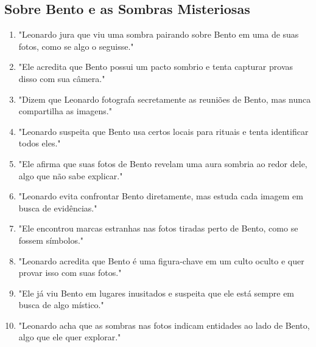\subsection*{Sobre Bento e as Sombras Misteriosas}
\begin{enumerate}
    \item "Leonardo jura que viu uma sombra pairando sobre Bento em uma de suas fotos, como se algo o seguisse."
    \item "Ele acredita que Bento possui um pacto sombrio e tenta capturar provas disso com sua câmera."
    \item "Dizem que Leonardo fotografa secretamente as reuniões de Bento, mas nunca compartilha as imagens."
    \item "Leonardo suspeita que Bento usa certos locais para rituais e tenta identificar todos eles."
    \item "Ele afirma que suas fotos de Bento revelam uma aura sombria ao redor dele, algo que não sabe explicar."
    \item "Leonardo evita confrontar Bento diretamente, mas estuda cada imagem em busca de evidências."
    \item "Ele encontrou marcas estranhas nas fotos tiradas perto de Bento, como se fossem símbolos."
    \item "Leonardo acredita que Bento é uma figura-chave em um culto oculto e quer provar isso com suas fotos."
    \item "Ele já viu Bento em lugares inusitados e suspeita que ele está sempre em busca de algo místico."
    \item "Leonardo acha que as sombras nas fotos indicam entidades ao lado de Bento, algo que ele quer explorar."
\end{enumerate}


